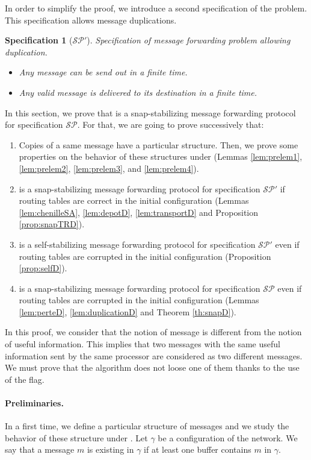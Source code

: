 \documentclass[11pt]{article}
\newtheorem{specification}{Specification}
\begin{document}
In order to simplify the proof, we introduce a second specification of the problem. This specification allows message duplications.
      
\begin{specification} [$\mathcal{SP}'$]
Specification of message forwarding problem allowing duplication.
\begin{itemize}
\item Any message can be send out in a finite time.
\item Any valid message is delivered to its destination in a finite time.
\end{itemize}
\end{specification}

In this section, we prove that \AD is a snap-stabilizing message forwarding protocol for specification $\mathcal{SP}$. For that, we are going to prove successively that:

\begin{enumerate}
\item Copies of a same message have a particular structure. Then, we prove some properties on the behavior of these structures under \AD(Lemmas \ref{lem:prelem1}, \ref{lem:prelem2}, \ref{lem:prelem3}, and \ref{lem:prelem4}).
\item \AD is a snap-stabilizing message forwarding protocol for specification $\mathcal{SP}'$ if routing tables are correct in the initial configuration (Lemmas \ref{lem:chenilleSA}, \ref{lem:depotD}, \ref{lem:transportD} and Proposition \ref{prop:snapTRD}). 
\item \AD is a self-stabilizing message forwarding protocol for specification $\mathcal{SP}'$ even if routing tables are corrupted in the initial configuration (Proposition \ref{prop:selfD}).
\item \AD is a snap-stabilizing message forwarding protocol for specification $\mathcal{SP}$ even if routing tables are corrupted in the initial configuration (Lemmas \ref{lem:perteD}, \ref{lem:duplicationD} and Theorem \ref{th:snapD}).
\end{enumerate}

In this proof, we consider that the notion of message is different from the notion of useful information. This implies that two messages with the same useful information sent by the same processor are considered as two different messages. We must prove that the algorithm does not loose one of them thanks to the use of the flag.

\paragraph{Preliminaries.}In a first time, we define a particular structure of messages and we study the behavior of these structure under \AD. Let $\gamma$ be a configuration of the network. We say that a message $m$ is existing in $\gamma$ if at least one buffer contains $m$ in $\gamma$.
\end{document}

